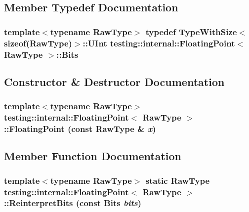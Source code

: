 \subsection{Member Typedef Documentation}
\subsubsection{\setlength{\rightskip}{0pt plus 5cm}template$<$typename RawType$>$ typedef {\bf TypeWithSize}$<$sizeof(RawType)$>$::UInt {\bf testing::internal::FloatingPoint}$<$ RawType $>$::{\bf Bits}}\label{classtesting_1_1internal_1_1FloatingPoint_62f65c1c1a218664ad46092e6bf43bb3}




\subsection{Constructor \& Destructor Documentation}
\subsubsection{\setlength{\rightskip}{0pt plus 5cm}template$<$typename RawType$>$ {\bf testing::internal::FloatingPoint}$<$ RawType $>$::{\bf FloatingPoint} (const RawType \& {\em x})\hspace{0.3cm}{\tt  [inline, explicit]}}\label{classtesting_1_1internal_1_1FloatingPoint_bb43acfcef65679c9b31556d0c98f4cc}




\subsection{Member Function Documentation}
\subsubsection{\setlength{\rightskip}{0pt plus 5cm}template$<$typename RawType$>$ static RawType {\bf testing::internal::FloatingPoint}$<$ RawType $>$::ReinterpretBits (const {\bf Bits} {\em bits})\hspace{0.3cm}{\tt  [inline, static]}}\label{classtesting_1_1internal_1_1FloatingPoint_03a1d12251225bfc26c6f728603c94d2}


